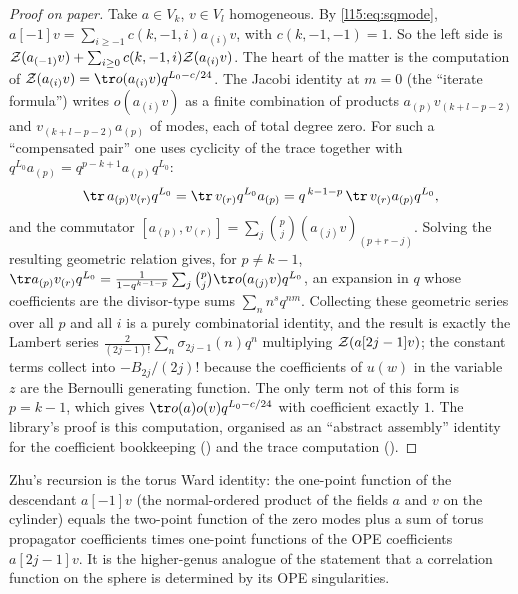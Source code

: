 \begin{proof}[Proof on paper]
Take $a\in V_k$, $v\in V_l$ homogeneous. By \eqref{l15:eq:sqmode}, $a[-1]v=\sum_{i\ge-1}c(k,-1,i)a_{(i)}v$, with
$c(k,-1,-1)=1$. So the left side is $\mathcal{Z}(a_{(-1)}v)+\sum_{i\ge0}c(k,-1,i)\mathcal{Z}(a_{(i)}v)$. The heart of the matter
is the computation of $\lfifteenZ(a_{(i)}v)=\tr o(a_{(i)}v)q^{L_0-c/24}$. The Jacobi identity at $m=0$ (the
``iterate formula'') writes $o(a_{(i)}v)$ as a finite combination of products $a_{(p)}v_{(k+l-p-2)}$ and
$v_{(k+l-p-2)}a_{(p)}$ of modes, each of total degree zero. For such a ``compensated pair'' one uses cyclicity of the trace
together with $q^{L_0}a_{(p)}=q^{p-k+1}a_{(p)}q^{L_0}$:
\begin{equation*}
\tr\,a_{(p)}v_{(r)}q^{L_0}=\tr\,v_{(r)}q^{L_0}a_{(p)}=q^{\,k-1-p}\,\tr\,v_{(r)}a_{(p)}q^{L_0},
\end{equation*}
and the commutator $[a_{(p)},v_{(r)}]=\sum_j\binom pj(a_{(j)}v)_{(p+r-j)}$. Solving the resulting geometric relation gives,
for $p\neq k-1$, $\tr a_{(p)}v_{(r)}q^{L_0}=\frac{1}{1-q^{k-1-p}}\sum_j\binom pj\tr o(a_{(j)}v)q^{L_0}$, an expansion in
$q$ whose coefficients are the divisor-type sums $\sum_n n^{s}q^{nm}$. Collecting these geometric series over all $p$ and
all $i$ is a purely combinatorial identity, and the result is exactly the Lambert series
$\frac{2}{(2j-1)!}\sum_n\sigma_{2j-1}(n)q^n$ multiplying $\mathcal{Z}(a[2j-1]v)$; the constant terms collect into
$-B_{2j}/(2j)!$ because the coefficients of $u(w)$ in the variable $z$ are the Bernoulli generating function. The only
term not of this form is $p=k-1$, which gives $\tr o(a)o(v)q^{L_0-c/24}$ with coefficient exactly $1$. The library's
proof is this computation, organised as an ``abstract assembly'' identity for the coefficient bookkeeping
() and the trace computation ().
\end{proof}

\begin{physics}
Zhu's recursion is the torus Ward identity: the one-point function of the descendant $a[-1]v$ (the normal-ordered product
of the fields $a$ and $v$ on the cylinder) equals the two-point function of the zero modes plus a sum of torus propagator
coefficients times one-point functions of the OPE coefficients $a[2j-1]v$. It is the higher-genus analogue of the
statement that a correlation function on the sphere is determined by its OPE singularities.
\end{physics}


